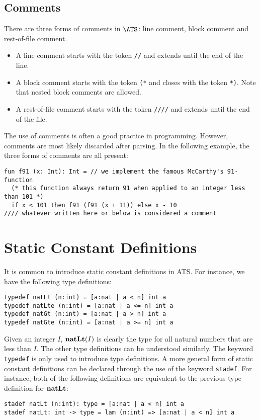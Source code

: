 \subsection{Comments}
There are three forms of comments in $\ATS$: line comment, block comment
and rest-of-file comment.
\begin{itemize}
\item
A line comment starts with the token \texttt{//} and extends until the end
of the line.
\item
A block comment starts with the token \texttt{(*} and closes with the token
\texttt{*)}. Note that nested block comments are allowed.
\item
A rest-of-file comment starts with the token \texttt{////} and extends
until the end of the file.
\end{itemize}
The use of comments is often a good practice in programming. However,
comments are most likely discarded after parsing.  In the following
example, the three forms of comments are all present:
\begin{verbatim}
fun f91 (x: Int): Int = // we implement the famous McCarthy's 91-function
  (* this function always return 91 when applied to an integer less than 101 *)
  if x < 101 then f91 (f91 (x + 11)) else x - 10
//// whatever written here or below is considered a comment

\end{verbatim}

\def\tnatLt{{\bf natLt}}
\section{Static Constant Definitions}
It is common to introduce static constant definitions in ATS.  For
instance, we have the following type definitions:
\begin{verbatim}
typedef natLt (n:int) = [a:nat | a < n] int a
typedef natLte (n:int) = [a:nat | a <= n] int a
typedef natGt (n:int) = [a:nat | a > n] int a
typedef natGte (n:int) = [a:nat | a >= n] int a
\end{verbatim}
Given an integer $I$, $\tnatLt(I)$ is clearly the type for all natural
numbers that are less than $I$. The other type definitions can be
understood similarly.  The keyword \texttt{typedef} is only used to
introduce type definitions.  A more general form of static constant
definitions can be declared through the use of the keyword
\texttt{stadef}. For instance, both of the following definitions are
equivalent to the previous type definition for $\tnatLt$:
\begin{verbatim}
stadef natLt (n:int): type = [a:nat | a < n] int a
stadef natLt: int -> type = lam (n:int) => [a:nat | a < n] int a
\end{verbatim}

